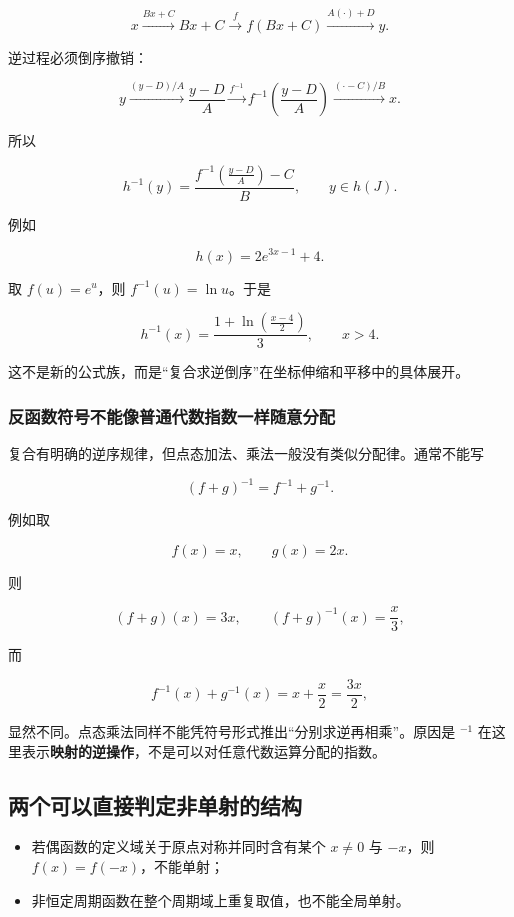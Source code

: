 \documentclass[11pt,a4paper]{ctexart}
\providecommand{\tightlist}{}
\begin{document}
\[
x
\xrightarrow{Bx+C}
Bx+C
\xrightarrow{f}
f(Bx+C)
\xrightarrow{A(\cdot)+D}
y.
\]

逆过程必须倒序撤销：

\[
y
\xrightarrow{(y-D)/A}
\frac{y-D}{A}
\xrightarrow{f^{-1}}
f^{-1}\left(\frac{y-D}{A}\right)
\xrightarrow{(\cdot-C)/B}
x.
\]

所以

\[
\boxed{
h^{-1}(y)
=
\frac{f^{-1}\left(\frac{y-D}{A}\right)-C}{B},
\qquad y\in h(J).
}
\]

例如

\[
h(x)=2e^{3x-1}+4.
\]

取 \(f(u)=e^u\)，则 \(f^{-1}(u)=\ln u\)。于是

\[
\boxed{
h^{-1}(x)
=
\frac{1+\ln\left(\frac{x-4}{2}\right)}3,
\qquad x>4.
}
\]

这不是新的公式族，而是``复合求逆倒序''在坐标伸缩和平移中的具体展开。

\subsubsection{反函数符号不能像普通代数指数一样随意分配}

复合有明确的逆序规律，但点态加法、乘法一般没有类似分配律。通常不能写

\[
(f+g)^{-1}=f^{-1}+g^{-1}.
\]

例如取

\[
f(x)=x,
\qquad
g(x)=2x.
\]

则

\[
(f+g)(x)=3x,
\qquad
(f+g)^{-1}(x)=\frac x3,
\]

而

\[
f^{-1}(x)+g^{-1}(x)
=x+\frac x2
=\frac{3x}{2},
\]

显然不同。点态乘法同样不能凭符号形式推出``分别求逆再相乘''。原因是
\(^{-1}\) 在这里表示\textbf{映射的逆操作}，不是可以对任意代数运算分配的指数。

\subsection{两个可以直接判定非单射的结构}\label{ux4e24ux4e2aux91cdux8981ux7684ux4e0dux53efux9006ux4fe1ux53f7}

\begin{itemize}
\tightlist
\item
  若偶函数的定义域关于原点对称并同时含有某个 \(x\ne0\) 与 \(-x\)，则
  \(f(x)=f(-x)\)，不能单射；
\item
  非恒定周期函数在整个周期域上重复取值，也不能全局单射。
\end{itemize}
\end{document}
